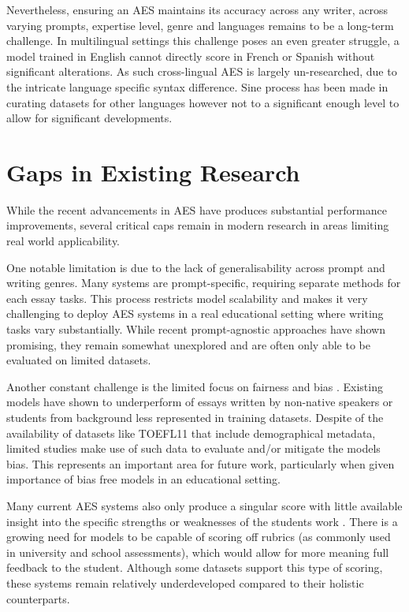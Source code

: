 \documentclass[10pt]{report}
\begin{document}
Nevertheless, ensuring an AES maintains its accuracy across any writer, across varying prompts, expertise level, genre and languages remains to be a long-term challenge. In multilingual settings this challenge poses an even greater struggle, a model trained in English cannot directly score in French or Spanish without significant alterations. As such cross-lingual AES is largely un-researched, due to the intricate language specific syntax difference. Sine process has been made in curating datasets for other languages however not to a significant enough level to allow for significant developments.


\section{Gaps in Existing Research}
While the recent advancements in AES have produces substantial performance improvements, several critical caps remain in modern research in areas limiting real world applicability.

One notable limitation is due to the lack of generalisability across prompt and writing genres. Many systems are prompt-specific, requiring separate methods for each essay tasks. This process restricts model scalability and makes it very challenging to deploy AES systems in a real educational setting where writing tasks vary substantially. While recent prompt-agnostic approaches have shown promising, they remain somewhat unexplored and are often only able to be evaluated on limited datasets.

Another constant challenge is the limited focus on fairness and bias \parencite{litman2024fairness}. Existing models have shown to underperform of essays written by non-native speakers or students from background less represented in training datasets. Despite of the availability of datasets like TOEFL11 that include demographical metadata, limited studies make use of such data to evaluate and/or mitigate the models bias. This represents an important area for future work, particularly when given importance of bias free models in an educational setting.

Many current AES systems also only produce a singular score with little available insight into the specific strengths or weaknesses of the students work \parencite{landauer2003iea}. There is a growing need for models to be capable of scoring off rubrics (as commonly used in university and school assessments), which would allow for more meaning full feedback to the student. Although some datasets support this type of scoring, these systems remain relatively underdeveloped compared to their holistic counterparts.
\end{document}
